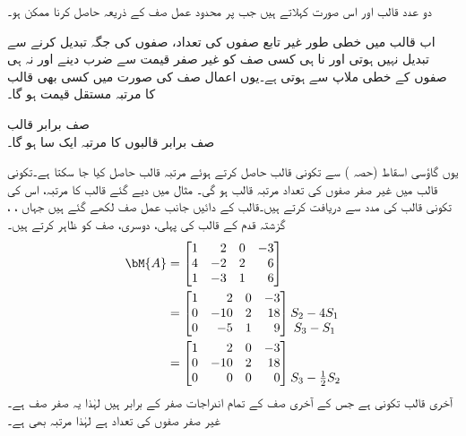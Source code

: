 دو عدد قالب  اور   اس صورت  کہلاتے ہیں جب  پر محدود عمل صف کے ذریعہ  حاصل کرنا ممکن ہو۔

اب قالب میں خطی طور غیر تابع صفوں کی تعداد، صفوں کی جگہ تبدیل کرنے سے  تبدیل نہیں ہوتی اور نا ہی کسی صف کو غیر صفر قیمت  سے ضرب دینے اور نہ ہی صفوں کے خطی ملاپ سے  ہوتی ہے۔یوں اعمال صف کی صورت میں کسی بھی قالب کا مرتبہ مستقل قیمت ہو گا۔

\quad صف برابر قالب\\
صف برابر قالبوں کا مرتبہ ایک سا  ہو گا۔

یوں گاؤسی اسقاط (حصہ ) سے  تکونی قالب حاصل کرتے ہوئے مرتبہ قالب حاصل کیا جا سکتا ہے۔تکونی قالب میں غیر صفر صفوں کی تعداد مرتبہ قالب ہو گی۔  
مثال  میں دیے گئے قالب کا مرتبہ، اس کی تکونی قالب کی مدد سے دریافت کرتے ہیں۔قالب کے دائیں جانب عمل صف لکھے گئے ہیں جہاں ، ،   گزشتہ قدم کے قالب کی پہلی، دوسری،   صف کو ظاہر کرتے ہیں۔
\begin{align*}
\bM{A}&=\begin{bmatrix*}[r] 1&2&0&-3\\4&-2&2&6\\1&-3&1&6 \end{bmatrix*}\\
&=\begin{bmatrix*}[r] 1&2&0&-3\\0&-10&2&18\\0&-5&1&9 \end{bmatrix*}\begin{matrix}\\ S_2-4S_1\\
S_3-S_1 \end{matrix}\\
&=\begin{bmatrix*}[r] 1&2&0&-3\\0&-10&2&18\\0&0&0&0 \end{bmatrix*}\begin{matrix}\\   \\
S_3-\frac{1}{2}S_2 \end{matrix}
\end{align*}
آخری قالب تکونی ہے جس کے آخری صف کے تمام اندراجات صفر کے برابر ہیں لہٰذا یہ صفر صف ہے۔غیر صفر صفوں کی تعداد  ہے لہٰذا  مرتبہ بھی  ہے۔

